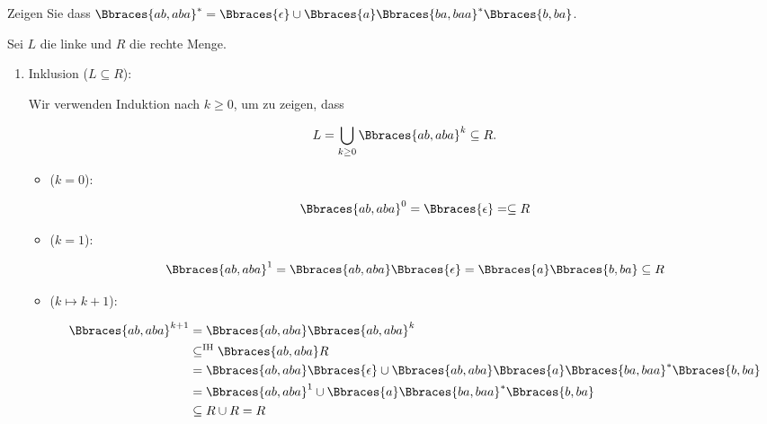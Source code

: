 
\begin{exercise}

Zeigen Sie dass $\Bbraces{ab, aba}^\ast = \Bbraces{\epsilon} \cup \Bbraces{a} \Bbraces{ba, baa}^\ast \Bbraces{b, ba}$.

\end{exercise}


\begin{solution}

Sei $L$ die linke und $R$ die rechte Menge.

\begin{enumerate}[label = \arabic*.]

    \item Inklusion ($L \subseteq R$):
    
    Wir verwenden Induktion nach $k \geq 0$, um zu zeigen, dass

    \begin{align*}
        L = \bigcup_{k \geq 0} \Bbraces{ab, aba}^k \subseteq R.
    \end{align*}

    \begin{itemize}

        \item ($k = 0$):
        
        \begin{align*}
            \Bbraces{ab, aba}^0
            =
            \Bbraces{\epsilon}
            =
            \subseteq
            R
        \end{align*}

        \item ($k = 1$):
        
        \begin{align*}
            \Bbraces{ab, aba}^1
            =
            \Bbraces{ab, aba} \Bbraces{\epsilon}
            =
            \Bbraces{a} \Bbraces{b, ba}
            \subseteq
            R
        \end{align*}

        \item ($k \mapsto k + 1$):
        
        \begin{align*}
            \Bbraces{ab, aba}^{k+1}
            & =
            \Bbraces{ab, aba} \Bbraces{ab, aba}^k \\
            & \subseteq^\text{IH}
            \Bbraces{ab, aba} R \\
            & =
            \Bbraces{ab, aba} \Bbraces{\epsilon} \cup \Bbraces{ab, aba} \Bbraces{a} \Bbraces{ba, baa}^\ast \Bbraces{b, ba} \\
            & =
            \Bbraces{ab, aba}^1 \cup \Bbraces{a} \Bbraces{ba, baa}^\ast \Bbraces{b, ba} \\
            & \subseteq
            R \cup R
            =
            R
        \end{align*}


\end{itemize}
\end{enumerate}
\end{solution}
